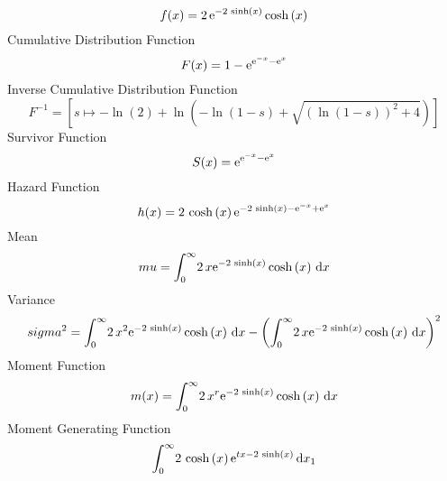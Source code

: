\documentclass[12pt]{article}
\begin{document}
$$  f(x)=2\,{{\rm e}^{-2\,\sinh \left( x \right) }}\cosh \left( x \right) 
$$Cumulative Distribution Function  
 $$F(x)=1-{{\rm e}^{{{\rm e}^{-x}}-{{\rm e}^{x}}}}
$$ Inverse Cumulative Distribution Function 
  $$F^{-1} = [s\mapsto -\ln  \left( 2 \right) +\ln  \left( -\ln  \left( 1-s
 \right) +\sqrt { \left( \ln  \left( 1-s \right)  \right) ^{2}+4}
 \right) ]
$$Survivor Function 
 $$ S(x)={{\rm e}^{{{\rm e}^{-x}}-{{\rm e}^{x}}}}
$$ Hazard Function 
 $$ h(x)=2\,\cosh \left( x \right) {{\rm e}^{-2\,\sinh \left( x \right) -{
{\rm e}^{-x}}+{{\rm e}^{x}}}}
$$Mean 
 $$ mu=\int_{0}^{\infty }\!2\,x{{\rm e}^{-2\,\sinh \left( x \right) }}\cosh
 \left( x \right) \,{\rm d}x
$$ Variance 
 $$ sigma^2 = \int_{0}^{\infty }\!2\,{x}^{2}{{\rm e}^{-2\,\sinh \left( x \right) }}
\cosh \left( x \right) \,{\rm d}x- \left( \int_{0}^{\infty }\!2\,x{
{\rm e}^{-2\,\sinh \left( x \right) }}\cosh \left( x \right) \,{\rm d}
x \right) ^{2}
$$Moment Function 
 $$ m(x) = \int_{0}^{\infty }\!2\,{x}^{r}{{\rm e}^{-2\,\sinh \left( x \right) }}
\cosh \left( x \right) \,{\rm d}x
$$ Moment Generating Function 
 $$\int_{0}^{\infty }\!2\,\cosh \left( x \right) {{\rm e}^{tx-2\,\sinh
 \left( x \right) }}\,{\rm d}x_{{1}}
$$
\end{document}
